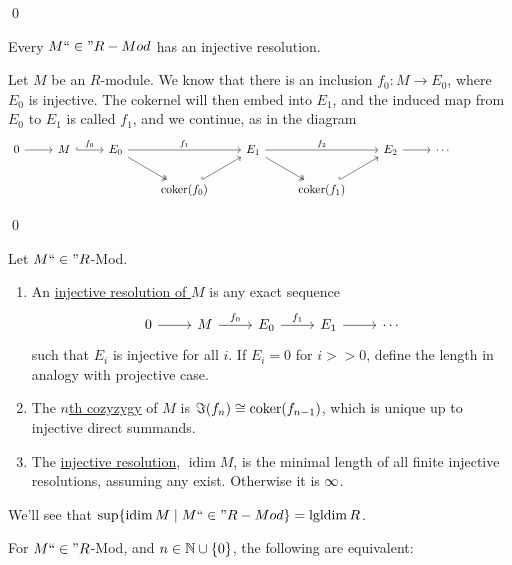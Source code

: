 \documentclass[x11names,reqno,14pt]{extarticle}
\newcommand{\fin}{``\in"}
\DeclareMathOperator{\lgldim}{lgldim}
\DeclareMathOperator{\idim}{idim}
\begin{document}
\qed

\cor

Every $M \fin R-Mod$ has an injective resolution.

\proof

Let $M$ be an $R$-module. We know that there is an inclusion $f_0:M\to E_0$, where $E_0$ is injective. The cokernel will then embed into $E_1$, and the induced map from $E_0$ to $E_1$ is called $f_1$, and we continue, as in the diagram
\[
\begin{tikzcd}
0\ar[r] & M\ar[r, hook, "f_0"] & E_0\ar[rr, "f_1"]\ar[dr, twoheadrightarrow] && E_1 \ar[dr, twoheadrightarrow] \ar[rr, "f_2"] && E_2\ar[r]&\cdots\\
		  & 							  &  & \coker(f_0)\ar[ur, hook] &  & \coker(f_1)\ar[ur, hook] &   &&&
\end{tikzcd}
\]

\qed


Let $M \fin R$-Mod. 

\begin{enumerate}

\item An \underline{injective resolution of $M$} is any exact sequence 
\[
\begin{tikzcd}
0\ar[r]&M\ar[r, "f_0"]&E_0\ar[r, "f_1"]&E_1 \ar[r]&\cdots 
\end{tikzcd}
\]
such that $E_i$ is injective for all $i$. If $E_i = 0$ for $i > > 0$, define the length in analogy with projective case. 

\item The \underline{$n$th cozyzygy} of $M$ is $\Im(f_n) \cong \operatorname{\mathrm{coker}}(f_{n - 1})$, which is unique up to injective direct summands. 

\item The \underline{injective resolution}, $\idim M$, is the minimal length of all finite injective resolutions, assuming any exist. Otherwise it is $\infty$. 

\end{enumerate}

\rem

We'll see that $\sup\{\idim M \mid M \fin R-Mod\} = \lgldim R$. 

\thm 

For $M \fin R$-Mod, and $n \in \mathbb{N}\cup\{0\}$, the following are equivalent: 
\end{document}
